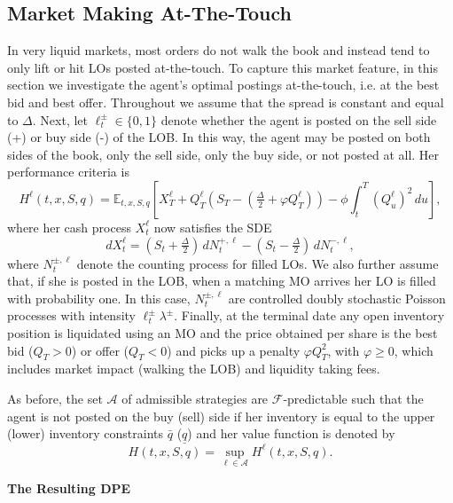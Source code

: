 \documentclass[11pt, a4paper]{book}
\newcommand{\E}{\mathbb{E}}
\begin{document}
	\subsection{Market Making At-The-Touch} \label{sec:10.2.2}
	
	In very liquid markets, most orders do not walk the book and instead tend to only lift or hit LOs posted at-the-touch. To capture this market feature, in this section we investigate the agent's optimal postings at-the-touch, i.e. at the best bid and best offer. Throughout we assume that the spread is constant and equal to $\Delta$. Next, let $\ell^\pm_t \in \{0, 1\}$ denote whether the agent is posted on the sell side (+) or buy side (-) of the LOB. In this way, the agent may be posted on both sides of the book, only the sell side, only the buy side, or not posted at all. Her performance criteria is
	\[
	H^\ell(t, x, S, q) = \E_{t,x,S,q} \left[ X^\ell_T + Q^\ell_T \left(S_T - (\tfrac{\Delta}{2} + \varphi Q^\ell_T)\right) - \phi \int_t^T (Q^\ell_u)^2 \, du \right],
	\]
	where her cash process $X^\ell_t$ now satisfies the SDE
	\[
	dX^\ell_t = (S_t + \tfrac{\Delta}{2}) \, dN^{+, \ell}_t - (S_t - \tfrac{\Delta}{2}) \, dN^{-, \ell}_t,
	\]
	where $N^{\pm, \ell}_t$ denote the counting process for filled LOs. We also further assume that, if she is posted in the LOB, when a matching MO arrives her LO is filled with probability one. In this case, $N^{\pm, \ell}_t$ are controlled doubly stochastic Poisson processes with intensity $\ell^\pm_t \lambda^\pm$. Finally, at the terminal date any open inventory position is liquidated using an MO and the price obtained per share is the best bid ($Q_T > 0$) or offer ($Q_T < 0$) and picks up a penalty $\varphi Q_T^2$, with $\varphi \geq 0$, which includes market impact (walking the LOB) and liquidity taking fees.
	
	As before, the set $\mathcal{A}$ of admissible strategies are $\mathcal{F}$-predictable such that the agent is not posted on the buy (sell) side if her inventory is equal to the upper (lower) inventory constraints $\bar{q}$ ($\underline{q}$) and her value function is denoted by
	\[
	H(t, x, S, q) = \sup_{\ell \in \mathcal{A}} H^\ell(t, x, S, q).
	\]
	
	\textbf{The Resulting DPE}
	
\end{document}
